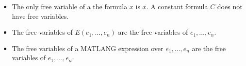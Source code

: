 \begin{itemize}
	\item The only free variable of a the formula $x$ is $x$. A constant formula $C$ does not have free variables.
	\item The free variables of $E(e_1,\ldots, e_n)$ are the free variables of $e_1,\ldots, e_n$.
	\item The free variables of a MATLANG expression over $e_1,\ldots, e_n$ are the free variables of $e_1,\ldots, e_n$.
\end{itemize}



